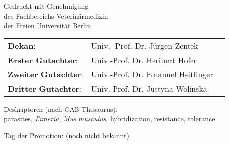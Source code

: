 \begin{center}
\thispagestyle{empty} %

Gedruckt mit Genehmigung \\
des Fachbereichs Veterinärmedizin \\
der Freien Universität Berlin
\end{center}

\vspace{2cm}

\begin{tabular}{ l l l } 
\textbf{Dekan}: & Univ.- Prof. Dr. J\"urgen Zentek \\
\textbf{Erster Gutachter}: & Univ.-Prof. Dr. Heribert Hofer \\
\textbf{Zweiter Gutachter}: & Univ.-Prof. Dr. Emanuel Heitlinger \\
\textbf{Dritter Gutachter}: & Univ.-Prof. Dr. Justyna Wolinska \\
\end{tabular}

\vspace{2cm}

Deskriptoren (nach CAB-Thesaurus):\\
parasites, \textit{Eimeria}, \textit{Mus musculus}, hybridization, resistance, tolerance

\vspace{2cm}

Tag der Promotion: (noch nicht bekannt)
